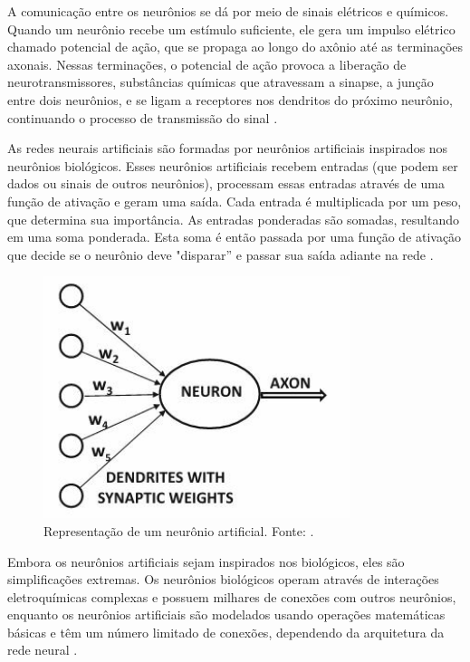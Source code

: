 A comunicação entre os neurônios se dá por meio de sinais elétricos e químicos. Quando um neurônio recebe um estímulo suficiente, ele gera um impulso elétrico chamado potencial de ação, que se propaga ao longo do axônio até as terminações axonais. Nessas terminações, o potencial de ação provoca a liberação de neurotransmissores, substâncias químicas que atravessam a sinapse, a junção entre dois neurônios, e se ligam a receptores nos dendritos do próximo neurônio, continuando o processo de transmissão do sinal \cite{aggarwal2018neural}.

As redes neurais artificiais são formadas por neurônios artificiais inspirados nos neurônios biológicos. Esses neurônios artificiais recebem entradas (que podem ser dados ou sinais de outros neurônios), processam essas entradas através de uma função de ativação e geram uma saída. Cada entrada é multiplicada por um peso, que determina sua importância. As entradas ponderadas são somadas, resultando em uma soma ponderada. Esta soma é então passada por uma função de ativação que decide se o neurônio deve "disparar” e passar sua saída adiante na rede \cite{goodfellow2016deep}.

\begin{figure}[ht]
    \centering
    \includegraphics[width=0.8\textwidth]{ArtificialNeuron.png} %
    \caption{Representação de um neurônio artificial. Fonte: \cite{aggarwal2018neural}.}
    \label{fig:ArtificialNeuron}
\end{figure}

Embora os neurônios artificiais sejam inspirados nos biológicos, eles são simplificações extremas. Os neurônios biológicos operam através de interações eletroquímicas complexas e possuem milhares de conexões com outros neurônios, enquanto os neurônios artificiais são modelados usando operações matemáticas básicas e têm um número limitado de conexões, dependendo da arquitetura da rede neural \cite{aggarwal2018neural}.

